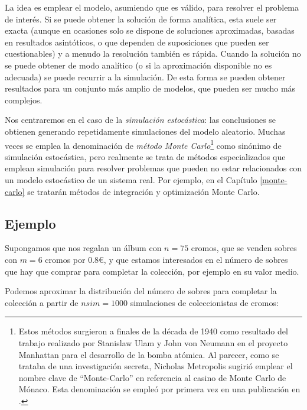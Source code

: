 \documentclass[
  10pt,
]{book}
\theoremstyle{break}
\theoremstyle{nonumberplain}
\let\oldfootnote\footnote
\renewcommand\footnote[1]{\oldfootnote{\hspace{2mm}#1}}
\begin{document}
La idea es emplear el modelo, asumiendo que es válido, para resolver el problema de interés.
Si se puede obtener la solución de forma analítica, esta suele ser exacta (aunque en ocasiones solo se dispone de soluciones aproximadas, basadas en resultados asintóticos, o que dependen de suposiciones que pueden ser cuestionables) y a menudo la resolución también es rápida.
Cuando la solución no se puede obtener de modo analítico (o si la aproximación disponible no es adecuada) se puede recurrir a la simulación.
De esta forma se pueden obtener resultados para un conjunto más amplio de modelos, que pueden ser mucho más complejos.

Nos centraremos en el caso de la \emph{simulación estocástica}: las conclusiones se obtienen generando repetidamente simulaciones del modelo aleatorio.
Muchas veces se emplea la denominación de \emph{método Monte Carlo}\footnote{Estos métodos surgieron a finales de la década de 1940 como resultado del trabajo realizado por Stanislaw Ulam y John von Neumann en el proyecto Manhattan para el desarrollo de la bomba atómica. Al parecer, como se trataba de una investigación secreta, Nicholas Metropolis sugirió emplear el nombre clave de ``Monte-Carlo'' en referencia al casino de Monte Carlo de Mónaco.
  Esta denominación se empleó por primera vez en una publicación en \citet{metropolis1949}.} como sinónimo de simulación estocástica, pero realmente se trata de métodos especializados que emplean simulación para resolver problemas que pueden no estar relacionados con un modelo estocástico de un sistema real. Por ejemplo, en el Capítulo \ref{monte-carlo} se tratarán métodos de integración y optimización Monte Carlo.

\hypertarget{ealbum}{%
\subsection{Ejemplo}\label{ealbum}}

Supongamos que nos regalan un álbum con \(n = 75\) cromos, que se venden sobres con \(m = 6\) cromos por 0.8€, y que estamos interesados en el número de sobres que hay que comprar para completar la colección, por ejemplo en su valor medio.

Podemos aproximar la distribución del número de sobres para completar la colección a partir de \(nsim=1000\) simulaciones de coleccionistas de cromos:
\end{document}
